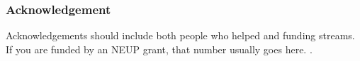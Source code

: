 \begin{frame}
  \frametitle{Acknowledgement}
        Acknowledgements should include both people who helped and funding 
        streams. If you are funded by an NEUP grant, that number usually goes 
        here. .
\end{frame}
